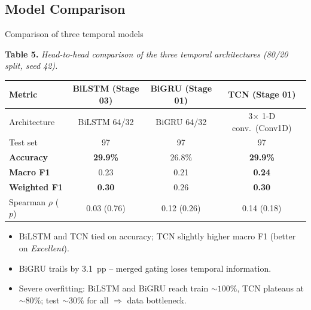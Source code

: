 
\subsection{Model Comparison}

\begin{frame}{Comparison of three temporal models}
\hypertarget{sub:comparison}{}%
\setlength{\tabcolsep}{6pt}
\small
\begin{center}
\textbf{Table 5.} \itshape Head-to-head comparison of the three temporal architectures (80/20 split, seed 42).\\[2pt]
\upshape
\begin{tabular}{l c c c}
\toprule
\textbf{Metric} & \textbf{BiLSTM (Stage 03)} & \textbf{BiGRU (Stage 01)} & \textbf{TCN (Stage 01)} \\
\midrule
Architecture           & BiLSTM 64/32 & BiGRU 64/32 & 3$\times$ 1-D conv.\ (Conv1D) \\
Test set               & 97           & 97          & 97 \\
\midrule
\textbf{Accuracy}      & \textbf{29.9\%} & 26.8\%   & \textbf{29.9\%} \\
\textbf{Macro F1}      & 0.23         & 0.21        & \textbf{0.24} \\
\textbf{Weighted F1}   & \textbf{0.30} & 0.26       & \textbf{0.30} \\
Spearman $\rho$ ($p$)  & 0.03 (0.76)  & 0.12 (0.26) & 0.14 (0.18) \\
\bottomrule
\end{tabular}
\end{center}
\vspace{4pt}
\begin{itemize}\small
    \item BiLSTM and TCN tied on accuracy; TCN slightly higher macro F1 (better on \emph{Excellent}).
    \item BiGRU trails by 3.1~pp -- merged gating loses temporal information.
    \item Severe overfitting: BiLSTM and BiGRU reach train $\sim\!100\%$, TCN plateaus at $\sim\!80\%$; test $\sim\!30\%$ for all $\Rightarrow$ data bottleneck.
\end{itemize}
\end{frame}

